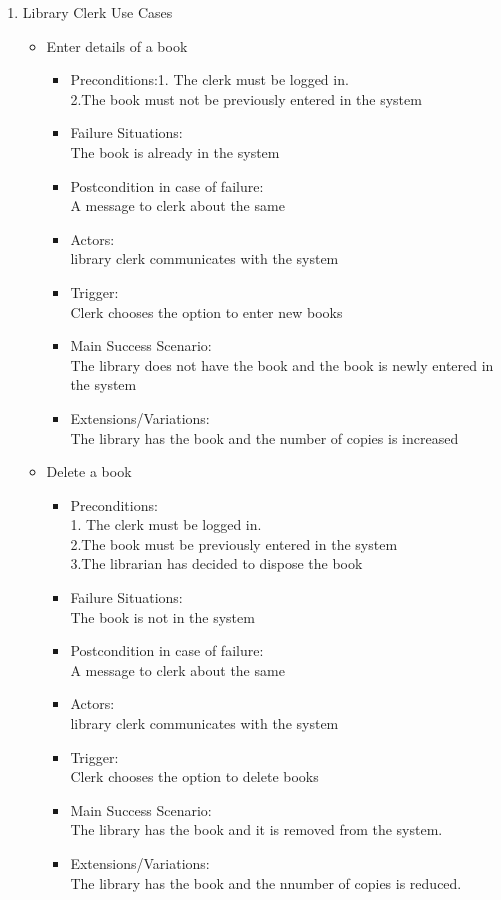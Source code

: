 \documentclass[a4paper]{article}
\begin{document}
\begin{enumerate}
\item Library Clerk Use Cases
 \begin{itemize}
 \item Enter details of a book
 \begin{itemize}
 \item Preconditions:1. The clerk must be logged in.\\2.The book must not be previously entered in the system
 \item Failure Situations:\\ The book is already in the system
 \item Postcondition in case of failure:\\A message to clerk about the same
 \item Actors:\\ library clerk communicates with the system
 \item Trigger:\\ Clerk chooses the option to enter new books
 \item Main Success Scenario:\\ The library  does not have the book and the book is newly entered in the system
\item  Extensions/Variations:\\ The library has the book and the number of copies is increased
\end{itemize}
 \item Delete a book 
 \begin{itemize}
	\item 	Preconditions:\\1. The clerk must be logged in.\\2.The book must  be previously entered in the system \\3.The librarian has decided to dispose the book\\
 \item Failure Situations:\\ The book is not in the system\\
 \item Postcondition in case of failure:\\A message to clerk about the same\\
 \item Actors:\\ library clerk communicates with the system\\
 \item Trigger:\\ Clerk chooses the option to delete books\\
 \item Main Success Scenario:\\ The library  has the book and it is removed from the system.\\
 \item Extensions/Variations: \\The library has the book and the nnumber of copies is reduced.\\
 

\end{itemize}
\end{itemize}
\end{enumerate}
\end{document}

